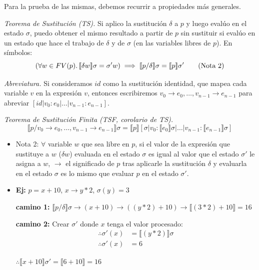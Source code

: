 \documentclass[a4paper,12pt]{article}
\begin{document}
\medskip

Para la prueba de las mismas, debemos recurrir a propiedades más generales.

\medskip

\noindent \textit{Teorema de Sustitución (TS).} Si aplico la sustitución $\delta$ a $p$ y luego evalúo en el estado $\sigma$, puedo obtener el mismo resultado a partir de $p$ sin sustituir si evalúo en un estado que hace el trabajo de $\delta$ y de $\sigma$ (en las variables libres de $p$). En símbolos:
\[
(\forall w \in FV(p) \ldotp \llbracket \delta w \rrbracket \sigma = \sigma' w) \implies \llbracket p / \delta \rrbracket \sigma = \llbracket p \rrbracket \sigma'
\tag{Nota 2} \] 

\noindent \textit{Abreviatura.} Si consideramos $id$ como la sustitución identidad, que mapea cada variable $v$ en la expresión $v$, entonces escribiremos $v_0 \to e_0, \dots, v_{n-1} \to e_{n-1}$ para abreviar $[id | v_0 : e_0 | \dots | v_{n-1} : e_{n-1}]$.

\medskip

\noindent \textit{Teorema de Sustitución Finita (TSF, corolario de TS).}
\[
\llbracket p / v_0 \to e_0, \dots, v_{n-1} \to e_{n-1} \rrbracket \sigma = \llbracket p \rrbracket [\sigma | v_0 : \llbracket e_0 \rrbracket \sigma | \dots | v_{n-1} : \llbracket e_{n-1} \rrbracket \sigma]
\]

\begin{tcolorbox}[title=Notaciones de autora]
\begin{itemize}
    \item Nota 2: $\forall$ variable $w$ que sea libre en $p$, si el valor de la expresión que sustituye a $w$ ($\delta w$) evaluada en el estado $\sigma$ es igual al valor que el estado $\sigma'$ le asigna a $w$, $\longrightarrow$ el significado de $p$ tras aplicarle la sustitución $\delta$ y evaluarla en el estado $\sigma$ es lo mismo que evaluar $p$ en el estado $\sigma'$.
    \item \noindent \textbf{Ej:} $p = x + 10$, \quad $x \to y * 2$, \quad $\sigma(y) = 3$

\medskip

\noindent \textbf{camino 1:} 
$\llbracket p/\delta \rrbracket \sigma \to (x+10) \to ((y*2)+10) \to \llbracket (3*2) + 10 \rrbracket = 16$

\medskip

\noindent \textbf{camino 2:} Crear $\sigma'$ donde $x$ tenga el valor procesado:
\begin{align*}
    \therefore \sigma'(x) &= \llbracket (y*2) \rrbracket \sigma \\
    \therefore \sigma'(x) &= 6
\end{align*}

\noindent $\therefore \llbracket x + 10 \rrbracket \sigma' = \llbracket 6 + 10 \rrbracket = 16$
\end{itemize}
\end{tcolorbox}
\end{document}
